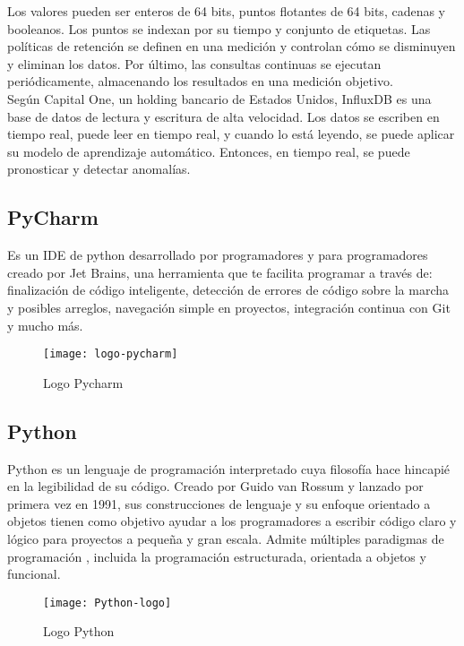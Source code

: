 \documentclass[ spanish, a4paper, 12pt, oneside]{report}
\begin{document}
Los valores pueden ser enteros de 64 bits, puntos flotantes de 64 bits, cadenas y booleanos. Los puntos se indexan por su tiempo y conjunto de etiquetas. Las políticas de retención se definen en una medición y controlan cómo se 
disminuyen y eliminan los datos. Por último, las consultas continuas se ejecutan periódicamente, almacenando los resultados en una medición objetivo. \\

Según Capital One, un holding bancario de Estados Unidos, InfluxDB es una base de datos de lectura y escritura de alta velocidad. Los datos se escriben en tiempo real, puede leer en tiempo real, y cuando lo está leyendo, se puede aplicar su modelo de aprendizaje automático. 
Entonces, en tiempo real, se puede pronosticar y detectar anomalías. \\


\subsection{PyCharm}
Es un IDE de python desarrollado por programadores y para programadores creado por Jet Brains, una herramienta que te facilita programar a través de: finalización de código inteligente, detección de errores de código sobre la marcha y posibles arreglos, navegación simple en proyectos, 
integración continua con Git y mucho más. \\

\begin{figure}[!h]
   \centering
   \texttt{[image: logo-pycharm]}\\
      \caption{\label{fig: Logo Pycharm} Logo Pycharm}
\end{figure}

\subsection{Python}
Python es un lenguaje de programación interpretado cuya filosofía hace hincapié en la legibilidad de su código. Creado por Guido van Rossum y lanzado por primera vez en 1991, sus construcciones de lenguaje y su enfoque orientado a objetos tienen como objetivo ayudar a los 
programadores a escribir código claro y lógico para proyectos a pequeña y gran escala. Admite múltiples paradigmas de programación , incluida la programación estructurada, orientada a objetos y funcional. \\

\begin{figure}[!h]
   \centering
   \texttt{[image: Python-logo]}\\
      \caption{\label{fig: Logo Python} Logo Python}
\end{figure}
\end{document}
